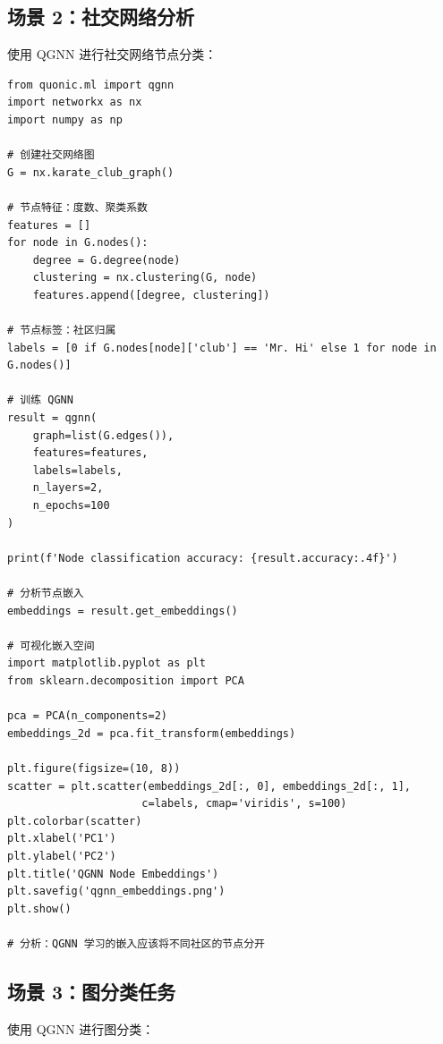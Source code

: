 \documentclass[12pt,a4paper]{article}
\begin{document}
\subsection{场景 2：社交网络分析}

使用 QGNN 进行社交网络节点分类：

\begin{verbatim}
from quonic.ml import qgnn
import networkx as nx
import numpy as np

# 创建社交网络图
G = nx.karate_club_graph()

# 节点特征：度数、聚类系数
features = []
for node in G.nodes():
    degree = G.degree(node)
    clustering = nx.clustering(G, node)
    features.append([degree, clustering])

# 节点标签：社区归属
labels = [0 if G.nodes[node]['club'] == 'Mr. Hi' else 1 for node in G.nodes()]

# 训练 QGNN
result = qgnn(
    graph=list(G.edges()),
    features=features,
    labels=labels,
    n_layers=2,
    n_epochs=100
)

print(f'Node classification accuracy: {result.accuracy:.4f}')

# 分析节点嵌入
embeddings = result.get_embeddings()

# 可视化嵌入空间
import matplotlib.pyplot as plt
from sklearn.decomposition import PCA

pca = PCA(n_components=2)
embeddings_2d = pca.fit_transform(embeddings)

plt.figure(figsize=(10, 8))
scatter = plt.scatter(embeddings_2d[:, 0], embeddings_2d[:, 1],
                     c=labels, cmap='viridis', s=100)
plt.colorbar(scatter)
plt.xlabel('PC1')
plt.ylabel('PC2')
plt.title('QGNN Node Embeddings')
plt.savefig('qgnn_embeddings.png')
plt.show()

# 分析：QGNN 学习的嵌入应该将不同社区的节点分开
\end{verbatim}

\subsection{场景 3：图分类任务}

使用 QGNN 进行图分类：
\end{document}
